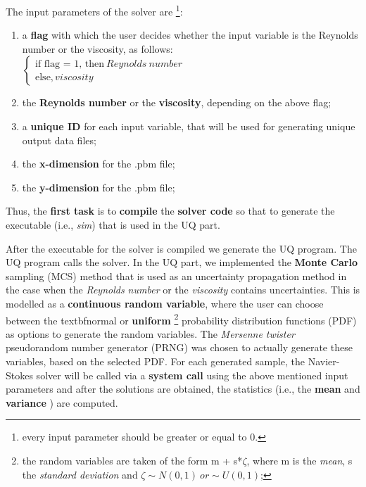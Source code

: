 \documentclass[12pt,a4paper]{article}
\begin{document}
The input parameters of the solver are \footnote{every input parameter should be greater or equal to 0.}:
\begin{enumerate}
\item {a \textbf{flag} with which the user decides whether the input variable is the Reynolds number or the viscosity, as follows}: \\
$\left\{
  \begin{array}{ccl}
    \text{if flag = 1, then} \ Reynolds \ number \\
    \text{else}, viscosity 
  \end{array}
\right.$
\item {the \textbf{Reynolds number} or the \textbf{viscosity}, depending on the above flag};
\item {a \textbf{unique ID} for each input variable, that will be used for generating unique output data files};
\item {the \textbf{x-dimension} for the .pbm file};
\item {the \textbf{y-dimension} for the .pbm file};
\end{enumerate}
%
Thus, the \textbf{first task} is to \textbf{compile} the \textbf{solver code} so that to generate the executable (i.e., \emph{sim}) that is used in the UQ part.
\newline

After the executable for the solver is compiled we generate the UQ program. The UQ program calls the solver. In the UQ part, we implemented the \textbf{Monte Carlo} sampling (MCS) method that is used as an uncertainty propagation method in the case when the \emph{Reynolds number} or the \emph{viscosity} contains uncertainties. This is modelled as a \textbf{continuous random variable}, where the user can choose between the textbf{normal} or \textbf{uniform} 
\footnote{the random variables are taken of the form m + s*$\zeta$, where m is the \textit{mean}, s the \textit{standard deviation} and $\zeta \sim N(0,1) \ or \sim U(0,1)$;} 
probability distribution functions (PDF) as options to generate the random variables. The \emph{Mersenne twister} pseudorandom number generator (PRNG) was chosen to actually generate these variables, based on the selected PDF. For each generated sample, the Navier-Stokes solver will be called via a \textbf{system call} using the above mentioned input parameters and after the solutions are obtained, the statistics (i.e., the \textbf{mean} and \textbf{variance} ) are computed.
\end{document}
